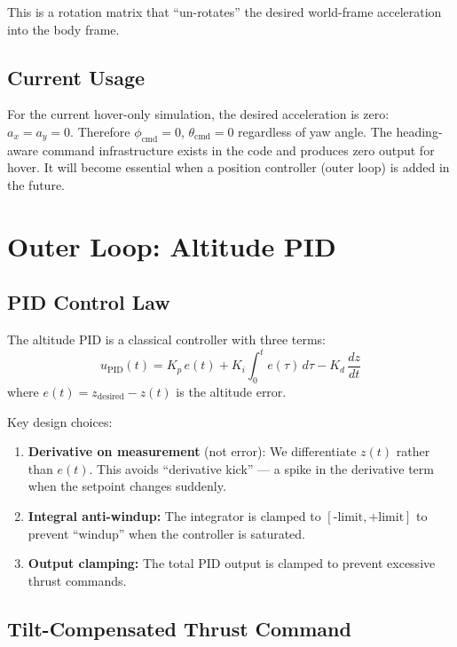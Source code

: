 \documentclass[12pt, a4paper]{article}
\begin{document}
This is a rotation matrix that ``un-rotates'' the desired world-frame acceleration into the body frame.

\subsection{Current Usage}

For the current hover-only simulation, the desired acceleration is zero: $a_x = a_y = 0$.  Therefore $\phi_{\text{cmd}} = 0$, $\theta_{\text{cmd}} = 0$ regardless of yaw angle.  The heading-aware command infrastructure exists in the code and produces zero output for hover.  It will become essential when a position controller (outer loop) is added in the future.

\section{Outer Loop: Altitude PID}
\label{sec:pid}

\subsection{PID Control Law}

The altitude PID is a classical controller with three terms:
\begin{equation}
    u_{\text{PID}}(t) = K_p \, e(t) + K_i \int_0^t e(\tau) \, d\tau - K_d \, \frac{dz}{dt}
\end{equation}
where $e(t) = z_{\text{desired}} - z(t)$ is the altitude error.

Key design choices:
\begin{enumerate}
    \item \textbf{Derivative on measurement} (not error): We differentiate $z(t)$ rather than $e(t)$.  This avoids ``derivative kick'' --- a spike in the derivative term when the setpoint changes suddenly.
    \item \textbf{Integral anti-windup:} The integrator is clamped to $[\text{-limit}, \text{+limit}]$ to prevent ``windup'' when the controller is saturated.
    \item \textbf{Output clamping:} The total PID output is clamped to prevent excessive thrust commands.
\end{enumerate}

\subsection{Tilt-Compensated Thrust Command}
\end{document}
